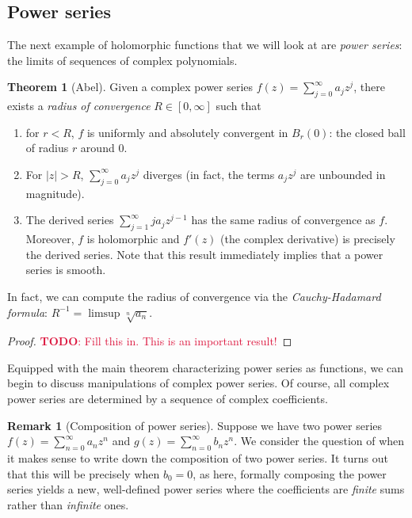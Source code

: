 \documentclass[aps,pra,showpacs,notitlepage,onecolumn,superscriptaddress,nofootinbib]{revtex4-1}
\newcommand{\pop}[1]{\textcolor{crimson}{#1}}
\theoremstyle{definition}
\newtheorem{theorem}{Theorem}[section]
\newtheorem{remark}{Remark}[section]
\begin{document}
\subsection{Power series}

\noindent The next example of holomorphic functions that we will look at are \emph{power series}: the limits of sequences of complex polynomials.

\begin{theorem}[Abel]
  Given a complex power series $f(z) = \sum_{j = 0}^{\infty} a_j z^{j}$, there exists a \emph{radius of convergence} $R \in [0, \infty]$ such that
  \begin{enumerate}
  \item for $r < R$, $f$ is uniformly and absolutely convergent in $B_r(0)$: the closed ball of radius $r$ around $0$.
  \item For $|z| > R$, $\sum_{j = 0}^{\infty} a_j z^j$ diverges (in fact, the terms $a_j z^j$ are unbounded in magnitude).
  \item The derived series $\sum_{j = 1}^{\infty} j a_j z^{j - 1}$ has the same radius of convergence as $f$. Moreover, $f$ is holomorphic and $f'(z)$ (the complex derivative)
    is precisely the derived series. Note that this result immediately implies that a power series is smooth.
  \end{enumerate}
  In fact, we can compute the radius of convergence via the \emph{Cauchy-Hadamard formula}: $R^{-1} = \limsup \sqrt[n]{a_n}$.
\end{theorem}

\begin{proof}
  \pop{\textbf{TODO}: Fill this in. This is an important result!}
\end{proof}

\noindent Equipped with the main theorem characterizing power series as functions, we can begin to discuss manipulations of complex power series. Of course, all complex power series are determined
by a sequence of complex coefficients.

\begin{remark}[Composition of power series]
  Suppose we have two power series $f(z) = \sum_{n = 0}^{\infty} a_n z^{n}$ and $g(z) = \sum_{n = 0}^{\infty} b_n z^n$. We consider the question of when it makes sense
  to write down the composition of two power series. It turns out that this will be precisely when $b_0 = 0$, as here, formally composing the power series yields a new, well-defined power series
  where the coefficients are \emph{finite} sums rather than \emph{infinite} ones.
  \end{remark}
\end{document}
